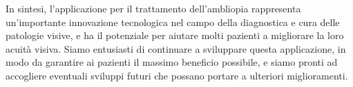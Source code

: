 \documentclass[
a4paper,
cleardoublepage=empty,
headings=twolinechapter,
numbers=autoenddot,
]{scrbook}
\begin{document}
   In sintesi, l'applicazione per il trattamento dell'ambliopia rappresenta un'importante innovazione tecnologica nel campo della diagnostica e cura delle patologie visive, e ha il potenziale per aiutare molti pazienti a migliorare la loro acuità visiva. Siamo entusiasti di continuare a sviluppare questa applicazione, in modo da garantire ai pazienti il massimo beneficio possibile, e siamo pronti ad accogliere eventuali sviluppi futuri che possano portare a ulteriori miglioramenti.
    
	
		
\end{document}
